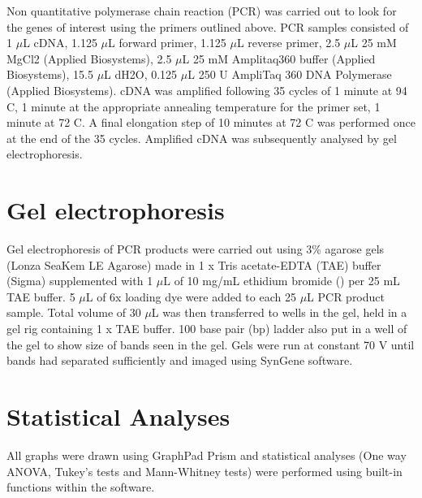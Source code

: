 Non quantitative polymerase chain reaction (PCR) was carried out to look for the genes of interest using the primers outlined above.
PCR samples consisted of 1 $\mu$L cDNA, 1.125 $\mu$L forward primer, 1.125 $\mu$L reverse primer, 2.5 $\mu$L 25 mM MgCl{2} (Applied Biosystems), 2.5 $\mu$L 25 mM Amplitaq360 buffer (Applied Biosystems), 15.5 $\mu$L dH{2}O, 0.125 $\mu$L 250 U AmpliTaq 360 DNA Polymerase (Applied Biosystems).
cDNA was amplified following 35 cycles of 1 minute at 94 \textdegree C, 1 minute at the appropriate annealing temperature for the primer set, 1 minute at 72 \textdegree C. 
A final elongation step of 10 minutes at 72 \textdegree C was performed once at the end of the 35 cycles.
Amplified cDNA was subsequently analysed by gel electrophoresis.

\section{Gel electrophoresis}

Gel electrophoresis of PCR products were carried out using 3\% agarose gels (Lonza SeaKem LE Agarose) made in 1 x Tris acetate-EDTA (TAE) buffer (Sigma) supplemented with 1 $\mu$L of 10 mg/mL ethidium bromide () per 25 mL TAE buffer.
5 $\mu$L of 6x loading dye  were added to each 25 $\mu$L PCR product sample.
Total volume of 30 $\mu$L was then transferred to wells in the gel, held in a gel rig containing 1 x TAE buffer.
100 base pair (bp) ladder also put in a well of the gel to show size of bands seen in the gel.
Gels were run at constant 70 V until bands had separated sufficiently and imaged using SynGene software.

\section{Statistical Analyses}

All graphs were drawn using GraphPad Prism and statistical analyses (One way ANOVA, Tukey's tests and Mann-Whitney tests) were performed using built-in functions within the software.
